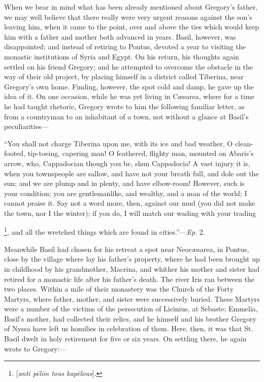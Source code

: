When we bear in mind what has been already mentioned about Gregory's
father, we may well believe that there really were very urgent reasons
against the son's leaving him, when it came to the point, over and
above the ties which would keep him with a father and mother both
advanced in years. Basil, however, was disappointed; and instead of
retiring to Pontus, devoted a year to visiting the monastic
institutions of Syria and Egypt. On his return, his thoughts again
settled on his friend Gregory; and he attempted to overcome the
obstacle in the way of their old project, by placing himself in a
district called Tiberina, near Gregory's own home. Finding, however,
the spot cold and damp, he gave up the idea of it. On one occasion,
while he was yet living in Cæsarea, where for a time he had taught
rhetoric, Gregory wrote to him the following familiar letter, as from
a countryman to an inhabitant of a town, not without a glance at Basil's
peculiarities—

``You shall not charge Tiberina upon me, with its ice and bad
weather, O clean-footed, tip-toeing, capering man! O feathered,
flighty man, mounted on Abaris's arrow, who, Cappadocian though you
be, shun Cappadocia! A vast injury it is, when you townspeople are
sallow, and have not your breath full, and dole out the sun; and we
are plump and in plenty, and have elbow-room! However, such is your
condition; you are gentlemanlike, and wealthy, and a man of the world;
I cannot praise it. Say not a word more, then, against our mud (you
did not make the town, nor I the winter); if you do, I will match our
wading with your trading

\footnote{[\emph{anti p\={e}l\={o}n
tous kap\={e}lous}].},
and all the wretched things which are found in cities.''—\emph{Ep}.
2.

Meanwhile Basil had chosen for his retreat a spot near Neocæsarea,
in Pontus, close by the village where lay his father's property, where
he had been brought up in childhood by his grandmother, Macrina, and
whither his mother and sister had retired for a monastic life after
his father's death. The river Iris ran between the two places. Within
a mile of their monastery was the Church of the Forty Martyrs, where
father, mother, and sister were successively buried. These Martyrs
were a number of the victims of the persecution of Licinius, at
Sebaste; Emmelia, Basil's mother, had collected their relics, and he himself and his brother Gregory of Nyssa have left us homilies in
celebration of them. Here, then, it was that St. Basil dwelt in holy
retirement for five or six years. On settling there, he again wrote to
Gregory:—

